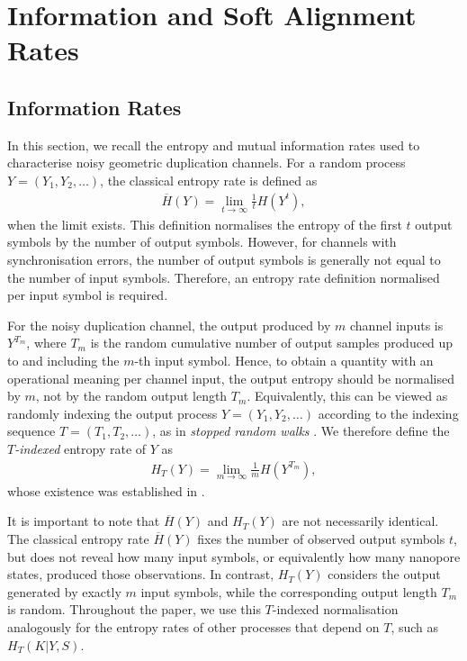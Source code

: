\documentclass[onecolumn]{IEEEtran}
\theoremstyle{definition}
\begin{document}
\section{Information and Soft Alignment Rates}\label{sec:rates}

\subsection{Information Rates}
In this section, we recall the entropy and mutual information rates used to characterise noisy geometric duplication channels.
For a random process \(Y=(Y_1,Y_2,\ldots)\), the classical entropy rate is
defined as
\begin{align}
    \overline{H}(Y) = \lim_{t\to\infty} \frac{1}{t} H(Y^t),
\end{align}
when the limit exists. This definition normalises the entropy of the first
\(t\) output symbols by the number of output symbols. However, for channels
with synchronisation errors, the number of output symbols is generally not
equal to the number of input symbols. Therefore, an entropy rate definition
normalised per input symbol is required.

For the noisy duplication channel, the output produced by \(m\) channel inputs
is \(Y^{T_m}\), where \(T_m\) is the random cumulative number of output samples produced up to and including the \(m\)-th input symbol. Hence, to obtain a quantity with an operational meaning per channel input, the output entropy should be
normalised by \(m\), not by the random output length \(T_m\). Equivalently,
this can be viewed as randomly indexing the output process
\(Y=(Y_1,Y_2,\ldots)\) according to the indexing sequence
\(T=(T_1,T_2,\ldots)\), as in {\em stopped random walks} \cite{Gut2009}. We therefore define the {\em\(T\)-indexed} entropy rate of
\(Y\) as
\begin{align}
    H_T(Y) = \lim_{m\to\infty} \frac{1}{m} H(Y^{T_m}),
\end{align}
{{whose existence was established in
\cite{McBain2024b}.}}

It is important to note that \(\overline{H}(Y)\) and \(H_T(Y)\) are not
necessarily identical. The classical entropy rate \(\overline{H}(Y)\) fixes the
number of observed output symbols \(t\), but does not reveal how many input
symbols, or equivalently how many nanopore states, produced those observations.
In contrast, \(H_T(Y)\) considers the output generated by exactly \(m\) input
symbols, while the corresponding output length \(T_m\) is random. Throughout
the paper, we use this \(T\)-indexed normalisation analogously for the entropy
rates of other processes that depend on \(T\), such as \(H_T(K|Y,S)\).
\end{document}
